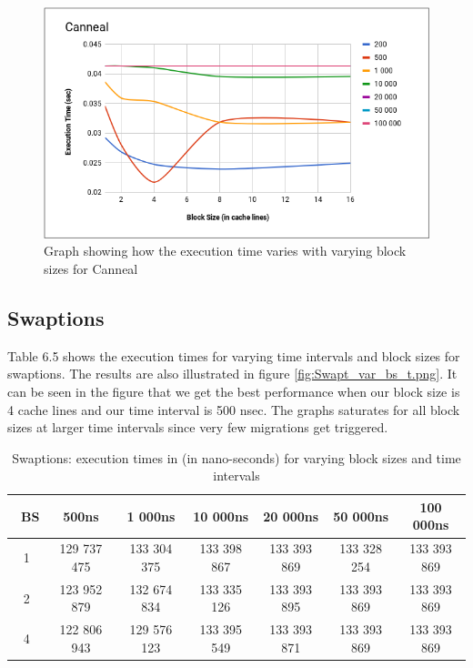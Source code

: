 \documentclass{listhesis}
\begin{document}
\begin{figure}
  \includegraphics[width=\linewidth]{Cann_var_bs_fordiff_t.png}
  \centering
  \caption{Graph showing how the execution time varies with varying block sizes for Canneal}
  \label{fig:Cann_var_bs_fordiff_t.png}
\end{figure}

\subsection{Swaptions}
Table 6.5 shows the execution times for varying time intervals and block sizes for swaptions. The results are also illustrated in figure \ref{fig:Swapt_var_bs_t.png}. It can be seen in the figure that we get the best performance when our block size is 4 cache lines and our time interval is 500 nsec. The graphs saturates for all block sizes at larger time intervals since very few migrations get triggered. 

\begin{table}[h!]
\begin{center}
 \begin{tabular}{|| c | c | c| c | c | c | c||} 
 \hline
 \ \textbf{BS}  & \textbf{500ns}  & \textbf{1 000ns} & \textbf{10 000ns} & \textbf{20 000ns} & \textbf{50 000ns} & \textbf{100 000ns}\\ [0.5 ex] 
 \hline\hline
   1 & 129 737 475 &  133 304 375 & 133 398 867 & 133 393 869 & 133 328 254 &  133 393 869 \\ 
 \hline
   2 & 123 952 879 & 132 674 834 & 133 335 126 & 133 393 895 & 133 393 869 & 133 393 869 \\
 \hline
   4 & 122 806 943 & 129 576 123 & 133 395 549 & 133 393 871 & 133 393 869 & 133 393 869 \\
 \hline
\end{tabular}
 \caption{Swaptions: execution times in (in nano-seconds) for varying block sizes and time intervals}
 \label{table:ExecTimes3}
\end{center}
\end{table}
\end{document}
